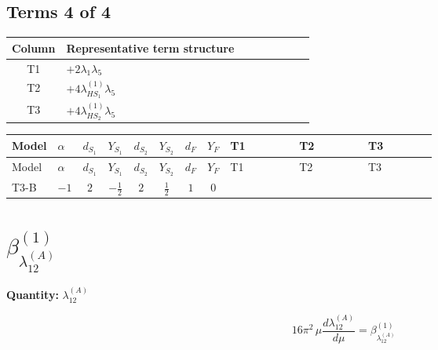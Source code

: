 \documentclass[8pt]{article}
\begin{document}
\begin{landscape}
\subsection*{Terms 4 of 4}
\begin{center}
\begin{tabular}{@{}c >{\raggedright\arraybackslash}p{0.82\linewidth}@{}}
\toprule
Column & Representative term structure \\
\midrule
T1 & \(\displaystyle +2 {\lambda_1} {\lambda_5}\) \\
\midrule
T2 & \(\displaystyle +4 {\lambda_{HS_1}^{(1)}} {\lambda_5}\) \\
\midrule
T3 & \(\displaystyle +4 {\lambda_{HS_2}^{(1)}} {\lambda_5}\) \\
\midrule
\bottomrule
\end{tabular}
\end{center}
\smallskip
\tiny
\begin{longtable}{@{}llcccccc >{\raggedright\arraybackslash}p{0.21\linewidth} >{\raggedright\arraybackslash}p{0.21\linewidth} >{\raggedright\arraybackslash}p{0.21\linewidth}@{}}
\toprule
Model & $\alpha$ & $d_{S_1}$ & $Y_{S_1}$ & $d_{S_2}$ & $Y_{S_2}$ & $d_F$ & $Y_F$ & T1 & T2 & T3 \\
\midrule
\endfirsthead
\toprule
Model & $\alpha$ & $d_{S_1}$ & $Y_{S_1}$ & $d_{S_2}$ & $Y_{S_2}$ & $d_F$ & $Y_F$ & T1 & T2 & T3 \\
\midrule
\endhead
T3-B & $-1$ & $2$ & $-\frac{1}{2}$ & $2$ & $\frac{1}{2}$ & $1$ & $0$ & \scriptsize\adjustbox{max width=\linewidth}{$\begin{gathered} +2 {\lambda_1} {\lambda_5}\end{gathered}$} & \scriptsize\adjustbox{max width=\linewidth}{$\begin{gathered} +4 {\lambda_{HS_1}^{(1)}} {\lambda_5}\end{gathered}$} & \scriptsize\adjustbox{max width=\linewidth}{$\begin{gathered} +4 {\lambda_{HS_2}^{(1)}} {\lambda_5}\end{gathered}$} \\
\midrule
\bottomrule
\end{longtable}
\clearpage
\section*{$\beta_{\lambda_{12}^{(A)}}^{(1)}$}
\noindent\textbf{Quantity: }$\lambda_{12}^{(A)}$\par\smallskip
\[16\pi^2\,\mu\frac{d \lambda_{12}^{(A)}}{d\mu}=\beta_{\lambda_{12}^{(A)}}^{(1)}\]

\end{landscape}
\end{document}
